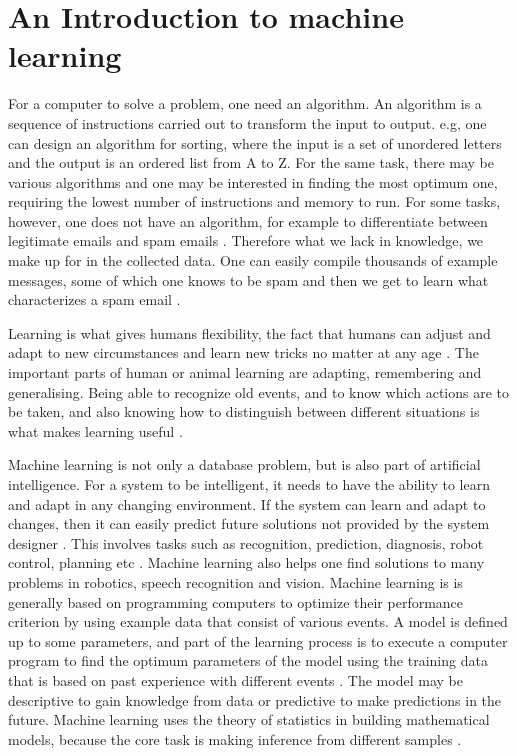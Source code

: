 \section{An Introduction to machine learning}
\label{Intro}

For a computer to solve a problem, one need an algorithm. An algorithm
is a sequence of instructions carried out to transform
the input to output. e.g, one can design an algorithm for
sorting, where the input is a set of unordered letters and the output is an ordered
list from A to Z. For the same task, there may be various algorithms and one may be
interested in finding the most optimum one, requiring the lowest number of
instructions and memory to run. For some tasks, however, one does not have an algorithm, for example to differentiate between legitimate emails and spam emails \citep{alpaydin2014introduction}. Therefore what we lack in knowledge, we make up for in the collected data. One can easily compile thousands of example messages, some of which one knows to be spam and then we get to learn what characterizes a spam email \citep{alpaydin2014introduction}. 

Learning is what gives humans flexibility, the fact that humans can adjust and adapt to new circumstances and learn new
tricks no matter at any age \citep{marsland2015machine}. The important parts of human or animal learning are adapting, remembering and generalising. Being able to recognize old events, and to know which actions are to be taken, and also knowing how to distinguish between different situations is what makes learning useful \citep{marsland2015machine}. 

 Machine learning is not only a database problem, but is also part
of artificial intelligence. For a system to be intelligent, it needs to have the ability to learn and adapt in any changing environment. If the system can learn and
adapt to changes, then it can easily predict future solutions not provided by the system designer \citep{alpaydin2014introduction}. This involves tasks such as  recognition, prediction, diagnosis, robot control,  
planning etc \citep{nilsson1996introduction}.
Machine learning also helps one find solutions to many problems in robotics, speech recognition and vision. Machine learning is is generally based on programming computers to optimize their performance criterion by using example data that consist of various events. A model is defined
up to some parameters, and part of the learning process is to execute a computer program
to find the optimum parameters of the model using the training data that is based on past experience with different events \citep{alpaydin2014introduction}. The model may be descriptive to gain knowledge from data or predictive to make predictions in the
future.
Machine learning uses the theory of statistics in building mathematical
models, because the core task is making inference from different samples \citep{alpaydin2014introduction}.



